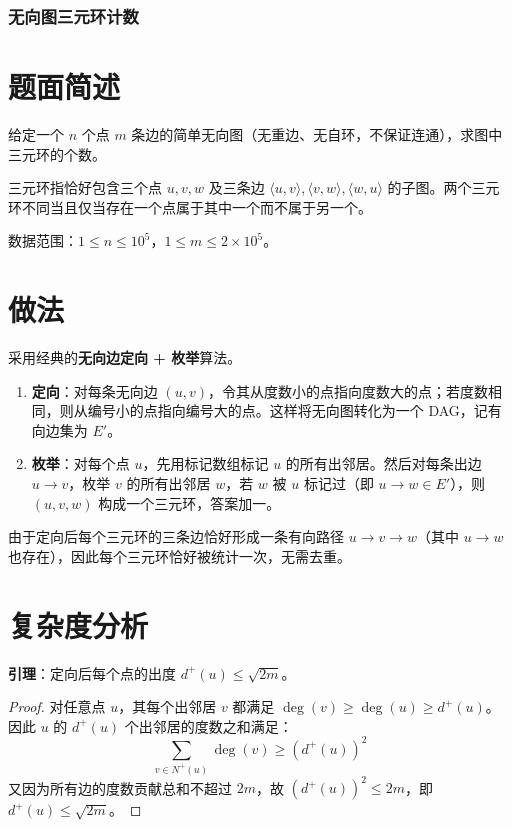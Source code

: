 \documentclass[11pt,a4paper,twocolumn]{ctexart}  %
\begin{document}
\subsubsection{无向图三元环计数}
\section*{题面简述}

给定一个 $n$ 个点 $m$ 条边的简单无向图（无重边、无自环，不保证连通），求图中三元环的个数。

三元环指恰好包含三个点 $u, v, w$ 及三条边 $\langle u,v\rangle, \langle v,w\rangle, \langle w,u\rangle$ 的子图。两个三元环不同当且仅当存在一个点属于其中一个而不属于另一个。

数据范围：$1 \le n \le 10^5$，$1 \le m \le 2 \times 10^5$。

\section*{做法}

采用经典的\textbf{无向边定向 + 枚举}算法。

\begin{enumerate}
    \item \textbf{定向}：对每条无向边 $(u, v)$，令其从度数小的点指向度数大的点；若度数相同，则从编号小的点指向编号大的点。这样将无向图转化为一个 DAG，记有向边集为 $E'$。
    \item \textbf{枚举}：对每个点 $u$，先用标记数组标记 $u$ 的所有出邻居。然后对每条出边 $u \to v$，枚举 $v$ 的所有出邻居 $w$，若 $w$ 被 $u$ 标记过（即 $u \to w \in E'$），则 $(u, v, w)$ 构成一个三元环，答案加一。
\end{enumerate}

由于定向后每个三元环的三条边恰好形成一条有向路径 $u \to v \to w$（其中 $u \to w$ 也存在），因此每个三元环恰好被统计一次，无需去重。

\section*{复杂度分析}

\textbf{引理}：定向后每个点的出度 $d^+(u) \le \sqrt{2m}$。

\begin{proof}
对任意点 $u$，其每个出邻居 $v$ 都满足 $\deg(v) \ge \deg(u) \ge d^+(u)$。因此 $u$ 的 $d^+(u)$ 个出邻居的度数之和满足：
\[
    \sum_{v \in N^+(u)} \deg(v) \ge (d^+(u))^2
\]
又因为所有边的度数贡献总和不超过 $2m$，故 $(d^+(u))^2 \le 2m$，即 $d^+(u) \le \sqrt{2m}$。
\end{proof}
\end{document}
